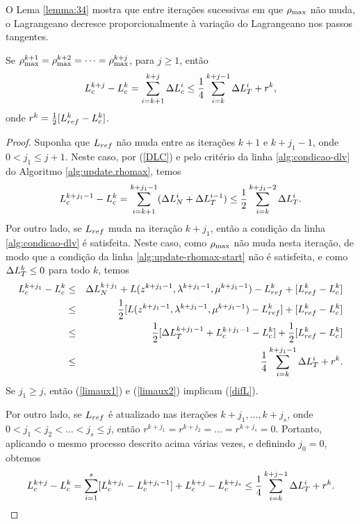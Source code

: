 O Lema \ref{lemma:34} mostra que entre iterações sucessivas em que $\rho_{\max}$ não
muda, o Lagrangeano decresce proporcionalmente à variação do Lagrangeano nos
passos tangentes.  \begin{lemma} Se
  $\rho_{\max}^{k+1}=\rho_{\max}^{k+2}=\dots=\rho_{\max}^{k+j}$, para $j \geq 1$, ent\~ao
\begin{equation}\visiblelbl{difL} 
  L_c^{k+j}-L_c^k = \sum_{i = k+1}^{k+j}\Delta
L_c^i \leq \frac{1}{4}\sum_{i = k}^{k+j-1}\DLH{i} + r^k, 
\end{equation} 
onde
$r^k = \frac{1}{2}[L_{ref}^k - L_c^k]$.  \end{lemma} \begin{proof} Suponha que $L_{ref}$
  n\~ao muda entre as itera\c{c}\~oes $k+1$ e $k+j_1-1$, onde $0<j_1\leq j+1$.
  Neste caso, por (\ref{DLC}) e pelo crit\'erio da linha \ref{alg:condicao-dlv}
  do Algoritmo \ref{alg:update.rhomax}, temos 
\begin{equation}\visiblelbl{limaux1}
  L_c^{k+j_1-1} - L_c^k = \sum_{i = k+1}^{k+j_1-1}(\DLV{i}+\DLH{i-1}) \leq
  \meio\sum_{i = k}^{k + j_1-2}\DLH{i}.  
\end{equation} 
Por outro lado, se $L_{ref}$
muda na itera\c{c}\~ao $k+j_1$, ent\~ao a condi\c{c}\~ao da linha
\ref{alg:condicao-dlv} \'e satisfeita. Neste caso, como $\rho_{\max}$ n\~ao muda
nesta itera\c{c}\~ao, de modo que a condição da linha
\ref{alg:update-rhomax-start} não \'e satisfeita, e como $\Delta L_T^{k} \leq 0$ para
todo $k$, temos
\begin{eqnarray} 
  L_c^{k+j_1}-L_c^k & \leq & \DLV{k+j_1}+L(z^{k+j_1-1}, \lk{k+j_1-1},
    \mu^{k+j_1-1}) - \Lref^k + [\Lref^k - L_c^k] \nonumber \\ 
  & \leq & \meio[L(z^{k+j_1-1}, \lk{k+j_1-1}, \mu^{k+j_1-1}) - \Lref^k] +
    [\Lref^k - L_c^k] \nonumber \\ 
  & \leq & \meio[\DLH{k+j_1-1}+L_c^{k+j_1-1} - L_c^k] + \meio[\Lref^k-L_c^k]
    \nonumber \\ 
  & \leq & \frac{1}{4}\sum_{i = k}^{k + j_1-1}\DLH{i} + r^k.
    \visiblelbl{limaux2} 
\end{eqnarray} 
Se $j_1 \geq j$,
ent\~ao (\ref{limaux1}) e (\ref{limaux2}) implicam (\ref{difL}).

Por outro lado, se $L_{ref}$ \'e atualizado nas itera\c{c}\~oes
$k+j_1,\dots,k+j_s$, onde $0<j_1<j_2<\dots<j_s\leq j$, ent\~ao $r^{k+j_1} =
r^{k+j_2} = \dots = r^{k+j_s} = 0$. Portanto, aplicando o mesmo processo
descrito acima v\'arias vezes, e definindo $j_0 = 0$, obtemos 
\begin{equation*}
  L_c^{k+j} - L_c^k = \sum_{i = 1}^s[L_c^{k+j_i} - L_c^{k+j_i-1}] + L_c^{k+j} -
  L_c^{k+j_s} \leq \frac{1}{4}\sum_{i = k}^{k + j-1}\Delta L_T^{i} + r^k .
\end{equation*}
\end{proof}

